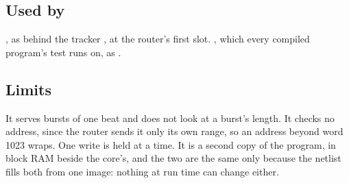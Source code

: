 \subsection*{Used by}

, as  behind the tracker , at the
router's first slot. , which every compiled program's
test runs on, as .

\subsection*{Limits}

It serves bursts of one beat and does not look at a burst's length. It
checks no address, since the router sends it only its own range, so
an address beyond word 1023 wraps. One write is held at a time. It is
a second copy of the program, in block RAM beside the core's, and the
two are the same only because the netlist fills both from one image:
nothing at run time can change either.
